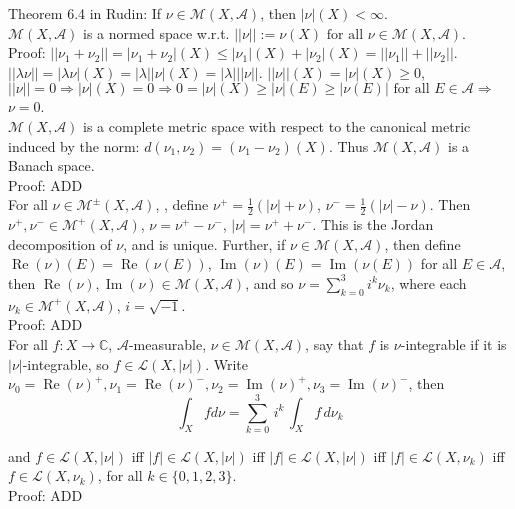 \documentclass[12pt]{article}
\newcommand{\fall}[0] { \textrm{ for all } }
\newcommand{\complexes}[0] { \mathbb{C}}
\newcommand{\A}[0] { \mathcal{A} }
\newcommand{\M}[0] { \mathcal{M} }
\newcommand{\Ell}[0] { \mathcal{L} }
\renewcommand{\Re}{ \operatorname{Re} }
\renewcommand{\Im}{ \operatorname{Im} }
\newcommand{\rimply}[0] { \Rightarrow }
\newcommand{\rarw}[0] { \rightarrow }
\begin{document}
Theorem 6.4 in Rudin: If $\nu \in \M(X, \A)$, then $|\nu|(X) < \infty$. \\

$\M(X, \A)$ is a normed space w.r.t. $||\nu|| := \nu(X) \fall \nu \in \M(X, \A)$. \\

\noindent
Proof: $|| \nu_1 + \nu_2 || = |\nu_1 + \nu_2|(X) \le |\nu_1|(X) + |\nu_2|(X) = ||\nu_1|| + ||\nu_2|| $. $||\lambda \nu|| = |\lambda \nu|(X) = |\lambda| |\nu|(X) = |\lambda| ||\nu||$. $||\nu||(X) = |\nu|(X) \ge 0$, $||\nu|| = 0 \rimply |\nu|(X) = 0 \rimply 0 = |\nu|(X) \ge |\nu|(E) \ge |\nu(E)| \fall E \in \A \rimply$ $\nu = 0$. \\

$\M(X, \A)$ is a complete metric space with respect to the canonical metric induced by the norm: $d(\nu_1,\nu_2) = (\nu_1-\nu_2)(X)$. Thus $\M(X, \A)$ is a Banach space. \\

\noindent
Proof: ADD \\

For all $ \nu \in \M^\pm(X, \A)$, , define $\nu^+ = \frac{1}{2}(|\nu| + \nu)$, $\nu^- = \frac{1}{2}(|\nu| - \nu)$. Then $\nu^+, \nu^- \in  \M^+(X, \A)$, $\nu = \nu^+ - \nu^-$, $|\nu| = \nu^+ + \nu^-$. This is the Jordan decomposition of $\nu$, and is unique. Further, if $\nu \in \M(X, \A)$, then define $\Re(\nu)(E) = \Re(\nu(E))$, $\Im(\nu)(E) = \Im(\nu(E))$ for all $E \in \A$, then $\Re(\nu), \Im(\nu) \in \M(X, \A)$, and so $\nu = \sum_{k=0}^3 i^k \nu_k$, where each $\nu_k \in \M^+(X, \A)$, $i = \sqrt{-1}$.\\

\noindent
Proof: ADD \\

For all $f:X \rarw \complexes$, $\A$-measurable, $\nu \in \M(X, \A)$, say that $f$ is $\nu$-integrable if it is $|\nu|$-integrable, so $f \in \Ell (X, |\nu|)$. Write $\nu_0 = \Re(\nu)^+, \nu_1 = \Re(\nu)^-, \nu_2 = \Im(\nu)^+, \nu_3 = \Im(\nu)^-$, then \\

$$
\int_X f d\nu = \sum_{k=0}^3 \, i^k \, \int_X f \, d\nu_k
$$

\noindent
and $f \in \Ell (X, |\nu|)$ iff $|f| \in \Ell (X, |\nu|)$ iff $|f| \in \Ell (X, |\nu|)$ iff $|f| \in \Ell (X, \nu_k)$ iff $f \in \Ell (X, \nu_k)$, for all $k \in \{0,1,2,3\}$. \\

\noindent
Proof: ADD \\
\end{document}
